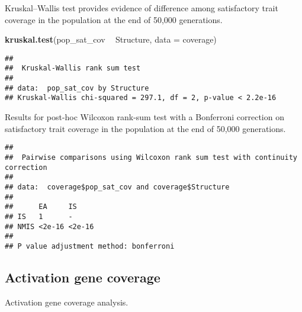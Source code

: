 \documentclass[]{book}
\newenvironment{Shaded}{\begin{snugshade}}{\end{snugshade}}
\newcommand{\DataTypeTok}[1]{\textcolor[rgb]{0.13,0.29,0.53}{#1}}
\newcommand{\KeywordTok}[1]{\textcolor[rgb]{0.13,0.29,0.53}{\textbf{#1}}}
\newcommand{\NormalTok}[1]{#1}
\newcommand{\OperatorTok}[1]{\textcolor[rgb]{0.81,0.36,0.00}{\textbf{#1}}}
\newcommand{\OtherTok}[1]{\textcolor[rgb]{0.56,0.35,0.01}{#1}}
\newcommand{\StringTok}[1]{\textcolor[rgb]{0.31,0.60,0.02}{#1}}
\begin{document}
Kruskal--Wallis test provides evidence of difference among satisfactory trait coverage in the population at the end of 50,000 generations.

\begin{Shaded}
\begin{Highlighting}[]
\KeywordTok{kruskal.test}\NormalTok{(pop_sat_cov }\OperatorTok{~}\StringTok{ }\NormalTok{Structure, }\DataTypeTok{data =}\NormalTok{ coverage)}
\end{Highlighting}
\end{Shaded}

\begin{verbatim}
## 
##  Kruskal-Wallis rank sum test
## 
## data:  pop_sat_cov by Structure
## Kruskal-Wallis chi-squared = 297.1, df = 2, p-value < 2.2e-16
\end{verbatim}

Results for post-hoc Wilcoxon rank-sum test with a Bonferroni correction on satisfactory trait coverage in the population at the end of 50,000 generations.

\begin{Shaded}
\end{Shaded}

\begin{verbatim}
## 
##  Pairwise comparisons using Wilcoxon rank sum test with continuity correction 
## 
## data:  coverage$pop_sat_cov and coverage$Structure 
## 
##      EA     IS    
## IS   1      -     
## NMIS <2e-16 <2e-16
## 
## P value adjustment method: bonferroni
\end{verbatim}

\hypertarget{activation-gene-coverage}{%
\subsection{Activation gene coverage}\label{activation-gene-coverage}}

Activation gene coverage analysis.
\end{document}
